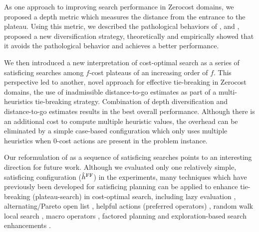  As one approach to improving search performance in Zerocost domains, we proposed a depth metric
       which measures the distance from the entrance to the
       plateau. Using this metric, we described the pathological
       behaviors of \fifo, \lifo and \ro, proposed a new diversification
       strategy, theoretically and empirically showed that it avoids the
       pathological behavior and achieves a better performance.

We then introduced a new interpretation of cost-optimal \astar search as a series of satisficing
       searches among $f$-cost plateaus of an increasing order of $f$. 
This perspective led to another, novel approach for effective tie-breaking in Zerocost domains, the use of
       inadmissible distance-to-go estimates as part of a multi-heuristics tie-breaking strategy.
       Combination of depth diversification and distance-to-go estimates results in the best overall performance. Although there is an additional cost to compute
       multiple heuristic values, the overhead can be eliminated by a simple
       case-based configuration which only uses multiple heuristics when 0-cost actions are present in the problem instance.

Our reformulation of \astar as a sequence of satisficing searches  points to  an interesting direction for future work.
Although we evaluated only one relatively simple, satisficing configuration ($\hat{h}^{\text{FF}}$) in
the experiments, many techniques which have previously been developed for satisficing planning can be applied to enhance tie-breaking (plateau-search) in cost-optimal search, including
lazy evaluation \cite{richter2010lama}, alternating/Pareto open
list \cite{RogerH10}, helpful actions (preferred operators) \cite{Hoffmann01},
random walk local search \cite{nakhost2009monte}, macro operators
\cite{Botea2005,ChrpaVM15}, factored planning
\cite{amir2003factored,brafman2006factored,Asai2015} and
exploration-based search enhancements
\cite{valenzano2014comparison,xie14type,Valenzano2016}.

